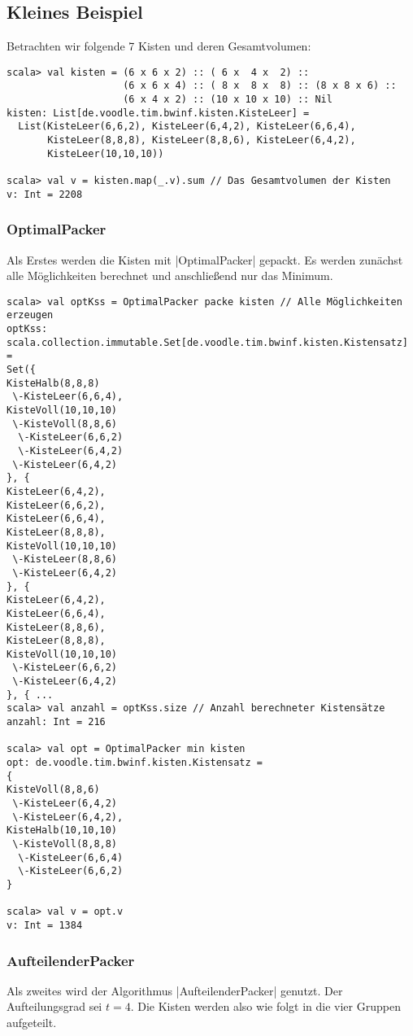 \subsection{Kleines Beispiel}
Betrachten wir folgende 7 Kisten und deren Gesamtvolumen:
\begin{lstlisting}
scala> val kisten = (6 x 6 x 2) :: ( 6 x  4 x  2) ::
                    (6 x 6 x 4) :: ( 8 x  8 x  8) :: (8 x 8 x 6) ::
                    (6 x 4 x 2) :: (10 x 10 x 10) :: Nil
kisten: List[de.voodle.tim.bwinf.kisten.KisteLeer] =
  List(KisteLeer(6,6,2), KisteLeer(6,4,2), KisteLeer(6,6,4),
       KisteLeer(8,8,8), KisteLeer(8,8,6), KisteLeer(6,4,2),
       KisteLeer(10,10,10))

scala> val v = kisten.map(_.v).sum // Das Gesamtvolumen der Kisten
v: Int = 2208

\end{lstlisting}

\subsubsection*{OptimalPacker}
Als Erstes werden die Kisten mit |OptimalPacker| gepackt.
Es werden zunächst alle Möglichkeiten berechnet und anschließend nur das Minimum.

\begin{lstlisting}
scala> val optKss = OptimalPacker packe kisten // Alle Möglichkeiten erzeugen
optKss: scala.collection.immutable.Set[de.voodle.tim.bwinf.kisten.Kistensatz] = 
Set({
KisteHalb(8,8,8)
 \-KisteLeer(6,6,4),
KisteVoll(10,10,10)
 \-KisteVoll(8,8,6)
  \-KisteLeer(6,6,2)
  \-KisteLeer(6,4,2)
 \-KisteLeer(6,4,2)
}, {
KisteLeer(6,4,2),
KisteLeer(6,6,2),
KisteLeer(6,6,4),
KisteLeer(8,8,8),
KisteVoll(10,10,10)
 \-KisteLeer(8,8,6)
 \-KisteLeer(6,4,2)
}, {
KisteLeer(6,4,2),
KisteLeer(6,6,4),
KisteLeer(8,8,6),
KisteLeer(8,8,8),
KisteVoll(10,10,10)
 \-KisteLeer(6,6,2)
 \-KisteLeer(6,4,2)
}, { ...
scala> val anzahl = optKss.size // Anzahl berechneter Kistensätze
anzahl: Int = 216

scala> val opt = OptimalPacker min kisten
opt: de.voodle.tim.bwinf.kisten.Kistensatz = 
{
KisteVoll(8,8,6)
 \-KisteLeer(6,4,2)
 \-KisteLeer(6,4,2),
KisteHalb(10,10,10)
 \-KisteVoll(8,8,8)
  \-KisteLeer(6,6,4)
  \-KisteLeer(6,6,2)
}

scala> val v = opt.v
v: Int = 1384
\end{lstlisting}

\subsubsection*{AufteilenderPacker}
Als zweites wird der Algorithmus |AufteilenderPacker| genutzt.
Der Aufteilungsgrad sei $t=4$.
Die Kisten werden also wie folgt in die vier Gruppen aufgeteilt.

